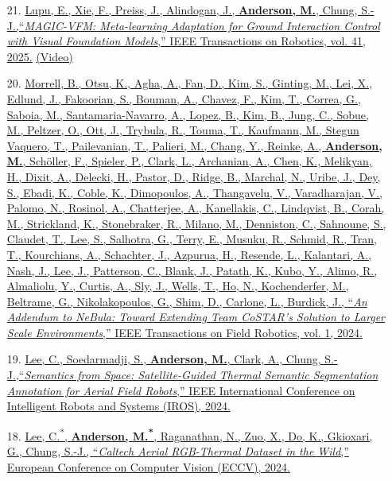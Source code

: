 \documentclass[12pt,letter,sans]{moderncv}        %
\begin{document}
\begin{itemize}

	\item [21.] \href{https://arxiv.org/pdf/2407.12304}
	{Lupu, E., Xie, F., Preiss, J., Alindogan, J.,  \underline{\textbf{Anderson, M.}}, Chung, S.-J.,``\textit{MAGIC-VFM: Meta-learning Adaptation for Ground Interaction Control with Visual Foundation Models},'' IEEE Transactions on Robotics, vol. 41, 2025.}
	\href{https://www.youtube.com/watch?v=sxM73ryweRA}{(Video)}

    \item [20.] \href{https://ieeexplore.ieee.org/document/10643435}
    {Morrell, B., Otsu, K., Agha, A., Fan, D., Kim, S., Ginting, M., Lei, X., Edlund, J., Fakoorian, S., Bouman, A., Chavez, F., Kim, T., Correa, G., Saboia, M., Santamaria-Navarro, A., Lopez, B., Kim, B., Jung, C., Sobue, M., Peltzer, O., Ott, J., Trybula, R., Touma, T., Kaufmann, M., Stegun Vaquero, T., Pailevanian, T., Palieri, M., Chang, Y., Reinke, A., \underline{\textbf{Anderson, M.}}, Sch\"{o}ller, F., Spieler, P., Clark, L., Archanian, A., Chen, K., Melikyan, H., Dixit, A., Delecki, H., Pastor, D., Ridge, B., Marchal, N., Uribe, J., Dey, S., Ebadi, K., Coble, K., Dimopoulos, A., Thangavelu, V., Varadharajan, V., Palomo, N., Rosinol, A., Chatterjee, A., Kanellakis, C., Lindqvist, B., Corah, M., Strickland, K., Stonebraker, R., Milano, M., Denniston, C., Sahnoune, S., Claudet, T., Lee, S., Salhotra, G., Terry, E., Musuku, R., Schmid, R., Tran, T., Kourchians, A., Schachter, J., Azpurua, H., Resende, L., Kalantari, A., Nash, J., Lee, J., Patterson, C., Blank, J., Patath, K., Kubo, Y., Alimo, R., Almaliolu, Y., Curtis, A., Sly, J., Wells, T., Ho, N., Kochenderfer, M., Beltrame, G., Nikolakopoulos, G., Shim, D., Carlone, L., Burdick, J., ``\textit{An Addendum to NeBula: Toward Extending Team CoSTAR's Solution to Larger Scale Environments},'' IEEE Transactions on Field Robotics, vol. 1, 2024.}
    
	\item [19.] \href{https://arxiv.org/pdf/2403.14056}
	{Lee, C., Soedarmadji, S.,  \underline{\textbf{Anderson, M.}}, Clark, A., Chung, S.-J.,``\textit{Semantics from Space: Satellite-Guided Thermal Semantic Segmentation Annotation for Aerial Field Robots},'' IEEE International Conference on Intelligent Robots and Systems (IROS), 2024.}

	\item [18.] \href{https://arxiv.org/pdf/2403.08997}
	{Lee, C.\textsuperscript{*}, \underline{\textbf{Anderson, M.\textsuperscript{*}}}, Raganathan, N., Zuo, X., Do, K., Gkioxari, G., Chung, S.-J., ``\textit{Caltech Aerial RGB-Thermal Dataset in the Wild},'' European Conference on Computer Vision (ECCV), 2024.}


\end{itemize}
\end{document}
